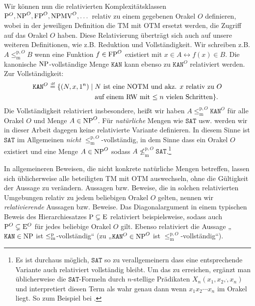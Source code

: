 Wir können nun die relativierten Komplexitätsklassen $\P^O, \NP^O, \FP^O, \NPMV^O, \dots$ relativ zu einem gegebenen Orakel $O$ definieren, wobei in der jeweiligen Definition die TM mit OTM ersetzt werden, die Zugriff auf das Orakel $O$ haben.
Diese Relativierung überträgt sich auch auf unsere weiteren Definitionen, wie z.B. Reduktion und Vollständigkeit. Wir schreiben z.B. $A\leq_\mathrm{m}^{\mathrm{p},O} B$ wenn eine Funktion $f\in\FP^O$ existiert mit $x\in A \leftrightarrow f(x)\in B$.
Die kanonische $\NP$-vollständige Menge $\mathtt{KAN}$ kann ebenso zu $\mathtt{KAN}^O$ relativiert werden. Zur Vollständigkeit:
\[ \begin{split} \mathtt{KAN}^O \defeq \{ (N, x, 1^n) \mid {}&\text{$N$ ist eine NOTM und akz. $x$ relativ zu $O$}\\&\text{auf einem RW mit $\leq n$ vielen Schritten} \}. \end{split} \]
Die Vollständigkeit relativiert insbesondere, heißt wir haben $A\leq_\mathrm{m}^{\mathrm{p},O}\mathtt{KAN}^O$ für alle Orakel $O$ und Menge $A\in\NP^O$.
Für \emph{natürliche} Mengen wie $\mathtt{SAT}$ usw. werden wir in dieser Arbeit dagegen keine relativierte Variante definieren. In diesem Sinne ist $\mathtt{SAT}$ im Allgemeinen \emph{nicht} $\leq_\mathrm{m}^{\mathrm{p},O}$-vollständig, in dem Sinne dass ein Orakel $O$ existiert und eine Menge $A\in\NP^O$ sodass $A\not\leq_\mathrm{m}^{\mathrm{p},O} \mathtt{SAT}$.\footnote{Es ist durchaus möglich, $\mathtt{SAT}$ so zu verallgemeinern dass eine entsprechende Variante auch relativiert vollständig bleibt. Um das zu erreichen, ergänzt man üblicherweise die $\mathtt{SAT}$-Formeln durch $n$-stellige Prädikaten $X_n(x_1, x_2, \dot, x_n)$ und interpretiert diesen Term als wahr genau dann wenn $x_1x_2\cdots x_n$ im Orakel liegt. So zum Beispiel bei \textcite{dingel_separation_2022}.}

In allgemeineren Beweisen, die nicht konkrete natürliche Mengen betreffen, lassen sich üblicherweise alle beteiligten TM mit OTM auswechseln, ohne die Gültigkeit der Aussage zu verändern.
Aussagen bzw. Beweise, die in solchen relativierten Umgebungen relativ zu jedem beliebigen Orakel $O$ gelten, nennen wir \emph{relativierende} Aussagen bzw. Beweise.
Das Diagonalargument in einem typischen Beweis des Hierarchiesatzes $\P\subsetneq\mathrm{E}$ relativiert beispielsweise, sodass auch $\P^O\subsetneq\mathrm{E}^O$ für jedes beliebige Orakel $O$ gilt. 
Ebenso relativiert die Aussage „$\mathtt{KAN}\in\NP$ ist $\leqmp$-vollständig“ (zu „$\mathtt{KAN}^O\in\NP^O$ ist $\leq_\mathrm{m}^{\mathrm{p},O}$-vollständig“).

